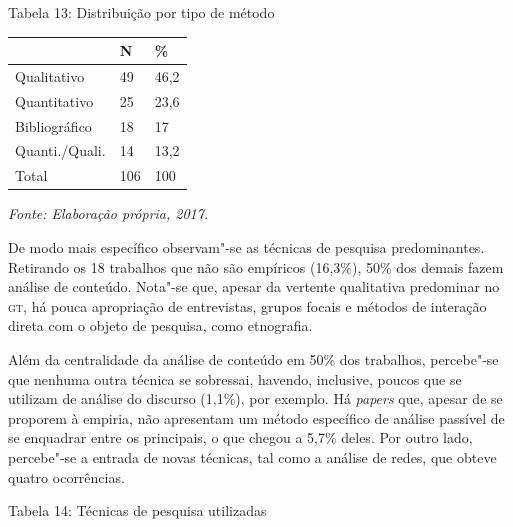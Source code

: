 \begin{center}
Tabela 13: Distribuição por tipo de método
\end{center}

\begin{center}
\centering
\begin{tabular}{|l|l|l|}
\hline
 & \textbf{N} & \textbf{\%} \\ \hline
Qualitativo & 49 & 46,2 \\ \hline
Quantitativo & 25 & 23,6 \\ \hline
Bibliográfico & 18 & 17 \\ \hline
Quanti./Quali. & 14 & 13,2 \\ \hline
Total & 106 & 100 \\ \hline
\end{tabular}
\end{center}

\begin{center}
{\footnotesize\emph{Fonte: Elaboração própria, 2017.}}
\end{center}

De modo mais específico observam"-se as técnicas de pesquisa
predominantes. Retirando os 18 trabalhos que não são empíricos (16,3\%),
50\% dos demais fazem análise de conteúdo. Nota"-se que, apesar da
vertente qualitativa predominar no \textsc{gt}, há pouca apropriação de
entrevistas, grupos focais e métodos de interação direta com o objeto de
pesquisa, como etnografia.

Além da centralidade da análise de conteúdo em 50\% dos trabalhos,
percebe"-se que nenhuma outra técnica se sobressai, havendo, inclusive,
poucos que se utilizam de análise do discurso (1,1\%), por exemplo. Há
\emph{papers} que, apesar de se proporem à empiria, não apresentam um
método específico de análise passível de se enquadrar entre os
principais, o que chegou a 5,7\% deles. Por outro lado, percebe"-se a
entrada de novas técnicas, tal como a análise de redes, que obteve
quatro ocorrências.

\begin{center}
Tabela 14: Técnicas de pesquisa utilizadas
\end{center}

